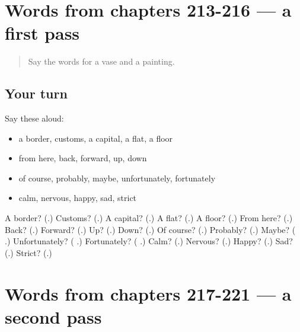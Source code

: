 \section[(dialogue)]{Words from chapters 213-216 — a first pass}

\label{lesson:RU-R221-first-pass-words-from-chapters-213-216}



\begin{quote}
Say the words for a vase and a painting.
\end{quote}

\subsection*{Your turn}
Say these aloud:

\begin{itemize}
\raggedright
  \item a border, customs, a capital, a flat, a floor
  \item from here, back, forward, up, down
  \item of course, probably, maybe, unfortunately, fortunately
  \item calm, nervous, happy, sad, strict
\end{itemize}

\begin{tcolorbox}[breakable,colback=teal!4,colframe=teal!35!black,title={Before you move on}]
A border? (\textbf{}.) Customs? (\textbf{}.) A capital? (\textbf{}.) A flat? (\textbf{}.) A floor? (\textbf{}.) From here? (\textbf{}.) Back? (\textbf{}.) Forward? (\textbf{}.) Up? (\textbf{}.) Down? (\textbf{}.) Of course? (\textbf{}.) Probably? (\textbf{}.) Maybe? (\textbf{ }.) Unfortunately? (\textbf{ }.) Fortunately? (\textbf{ }.) Calm? (\textbf{}.) Nervous? (\textbf{}.) Happy? (\textbf{}.) Sad? (\textbf{}.) Strict? (\textbf{}.)
\end{tcolorbox}
\section[(dialogue)]{Words from chapters 217-221 — a second pass}

\label{lesson:RU-R221-second-pass-words-from-chapters-217-221}



